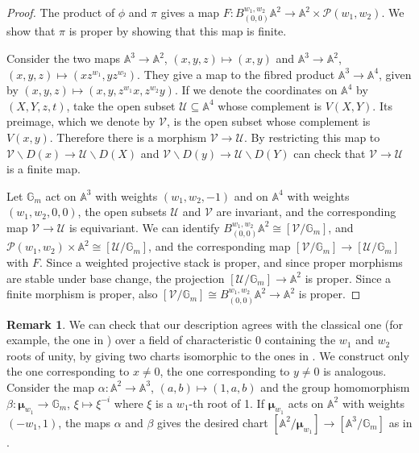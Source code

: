 \documentclass[11pt]{amsart}
\theoremstyle{definition}
\newtheorem{remark}[theorem]{Remark}
\theoremstyle{remark}
\newcommand{\bA}{{\mathbb A}}
\newcommand{\calU}{\mathcal U}
\newcommand{\calP}{\mathcal P}
\newcommand{\calV}{\mathcal V}
\newcommand{\bmu}{\boldsymbol{\mu}}
\newcommand{\bG}{\mathbb{G}}
\begin{document}
\begin{proof}The product of $\phi$ and $\pi$ gives a map $F:B^{w_1,w_2}_{(0,0)}\mathbb{A}^2 \to \mathbb{A}^2\times \calP(w_1, w_2)$. We show that $\pi$ is proper by showing that this map is finite.


Consider the two maps $\mathbb{A}^3\to \bA^2$, $(x,y,z)\mapsto (x,y)$ and $\mathbb{A}^3\to \bA^2$, $(x,y,z)\mapsto (xz^{w_1}, yz^{w_2})$.
They give a map to the fibred product $\mathbb{A}^3\to \bA^4$, given by $(x,y,z)\mapsto (x,y,z^{w_1}x,z^{w_2}y)$. If we denote the coordinates on $\mathbb{A}^4$ by $(X,Y,z,t)$, take the open subset $\calU\subseteq \mathbb{A}^4$ whose complement is $V(X,Y)$. Its preimage, which we denote by $\calV$, is the open subset whose complement is $V(x,y)$. Therefore there is a morphism $\calV\to \calU$.
By restricting this map to $\calV\smallsetminus D(x)\to \calU\smallsetminus D(X)$ and $\calV\smallsetminus D(y)\to \calU\smallsetminus D(Y)$ can check that $\calV\to \calU$ is a finite map.

Let $\bG_m$ act on $\bA^3$ with weights $(w_1, w_2, -1)$ and on $\bA^4$ with weights $(w_1, w_2, 0, 0)$, the open subsets $\calU$ and $\calV$ are invariant, and the corresponding map $\calV\to \calU$ is equivariant. We can identify $B^{w_1,w_2}_{(0,0)}\bA^2 \cong [\calV/\bG_m]$, and $\calP(w_1,w_2)\times \bA^2 \cong [\calU/\bG_m]$, and the corresponding map $[\calV/\bG_m]\to [\calU/\bG_m]$ with $F$. Since a weighted projective stack is proper, and since proper morphisms are stable under base change, the projection $[\calU/\bG_m]\to \bA^2$ is proper. Since a finite morphism is proper, also $[\calV/\bG_m]\cong B^{w_1,w_2}_{(0,0)}\bA^2 \to \bA^2$ is proper. 
\end{proof}
\begin{remark}\label{remark_dan_definition_weighted}
We can check that our description agrees with the classical one (for example, the one in \cite[Section 3]{ATW19}) over a field of characteristic 0 containing the $w_1$ and $w_2$ roots of unity, by giving two charts isomorphic to the ones in \cite[Section 3.4]{ATW19}. We construct only the one corresponding to $x\neq 0$, the one corresponding to $y \neq 0$ is analogous. Consider the map $\alpha:\mathbb{A}^2 \to \mathbb{A}^3$, $(a,b)\mapsto (1,a,b)$ and the group
homomorphism $\beta: \bmu_{w_1}\to \bG_m$, $\xi \mapsto \xi^{-i}$ where $\xi$ is a $w_1$-th root of 1. If $\bmu_{w_1}$ acts on $\mathbb{A}^2$ with weights $(-w_1, 1)$, the maps $\alpha$ and $\beta$ gives the desired chart $[\mathbb{A}^2/\bmu_{w_1}]\to [\mathbb{A}^3/\bG_m]$ as in \cite[Section 3.4]{ATW19}.
\end{remark}
\end{document}
